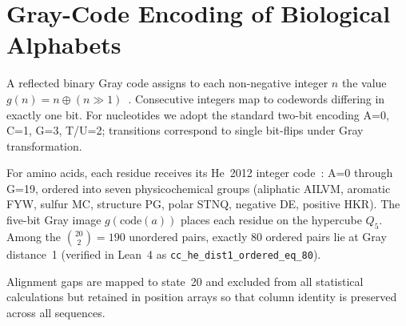 \section{Gray-Code Encoding of Biological Alphabets}
\label{sec:theory-gray}

A reflected binary Gray code assigns to each non-negative integer $n$ the
value $g(n) = n \oplus (n \gg 1)$~\cite{gray1953}.  Consecutive integers map
to codewords differing in exactly one bit.  For nucleotides we adopt the
standard two-bit encoding A=0, C=1, G=3, T/U=2; transitions correspond to
single bit-flips under Gray transformation.

For amino acids, each residue receives its He~2012 integer
code~\cite{he2012}: A=0 through G=19, ordered into seven physicochemical
groups (aliphatic AILVM, aromatic FYW, sulfur MC, structure PG, polar STNQ,
negative DE, positive HKR).  The five-bit Gray image $g(\mathrm{code}(a))$
places each residue on the hypercube $Q_5$.  Among the $\binom{20}{2}=190$
unordered pairs, exactly 80 ordered pairs lie at Gray distance~1 (verified in
Lean~4 as \texttt{cc\_he\_dist1\_ordered\_eq\_80}).

Alignment gaps are mapped to state~20 and excluded from all statistical
calculations but retained in position arrays so that column identity is
preserved across all sequences.
